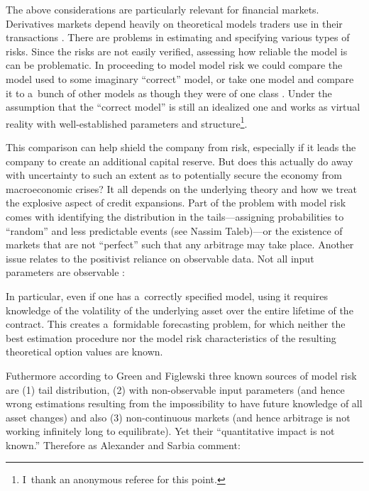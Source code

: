 The above considerations are particularly relevant for financial markets. Derivatives markets depend heavily on theoretical models traders use in their transactions 
\parencite[][p.1466]{green_market_1999}. %
 There are problems in estimating and specifying various types of risks. Since the risks are not easily verified, assessing how reliable the model is can be problematic. In proceeding to model model risk we could compare the model used to some imaginary ``correct'' model, or take one model and compare it to a~bunch of other models as though they were of one class 
\parencite[][p.268]{kerkhof_model_2010}. %
 Under the assumption that the ``correct model'' is still an idealized one and works as virtual reality with well-established parameters and structure\footnote{I~thank an anonymous referee for this point.}.



This comparison can help shield the company from risk, especially if it leads the company to create an additional capital reserve. But does this actually do away with uncertainty to such an extent as to potentially secure the economy from macroeconomic crises? It all depends on the underlying theory and how we treat the explosive aspect of credit expansions. Part of the problem with model risk comes with identifying the distribution in the tails---assigning probabilities to ``random'' and less predictable events (see Nassim Taleb)---or the existence of markets that are not ``perfect'' such that any arbitrage may take place. Another issue relates to the positivist reliance on observable data. Not all input parameters are observable 
\parencite[][p.1467]{green_market_1999}:%




In particular, even if one has a~correctly specified model, using it requires knowledge of the volatility of the underlying asset over the entire lifetime of the contract. This creates a~formidable forecasting problem, for which neither the {\textquotedbl}best{\textquotedbl} estimation procedure nor the model risk characteristics of the resulting theoretical option values are known.



Futhermore according to Green and Figlewski three known sources of model risk are (1) tail distribution, (2) with non-observable input parameters (and hence wrong estimations resulting from the impossibility to have future knowledge of all asset changes) and also (3) non-continuous markets (and hence arbitrage is not working infinitely long to equilibrate). Yet their ``quantitative impact is not known.'' Therefore as Alexander and Sarbia 
\parencite*[][pp.1295–1296]{alexander_quantile_2012} %
 comment:



